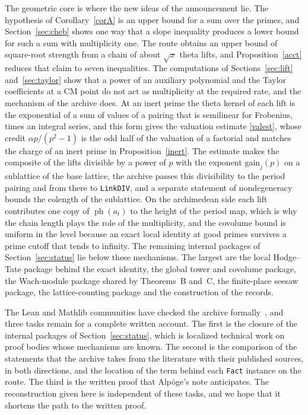 \documentclass[11pt,letterpaper]{article}
\numberwithin{equation}{section}
\begin{document}
The geometric core is where the new ideas of the announcement lie. The hypothesis of Corollary~\ref{corA} is an upper bound for a sum over the primes, and Section~\ref{sec:cheb} shows one way that a slope inequality produces a lower bound for such a sum with multiplicity one. The route obtains an upper bound of square-root strength from a chain of about $\sqrt x$ theta lifts, and Proposition~\ref{acct} reduces that claim to seven inequalities. The computations of Sections~\ref{sec:lift} and~\ref{sec:taylor} show that a power of an auxiliary polynomial and the Taylor coefficients at a CM point do not act as multiplicity at the required rate, and the mechanism of the archive does. At an inert prime the theta kernel of each lift is the exponential of a sum of values of a pairing that is semilinear for Frobenius, times an integral series, and this form gives the valuation estimate \eqref{valest}, whose credit $\alpha p/(p^2-1)$ is the odd half of the valuation of a factorial and matches the charge of an inert prime in Proposition~\ref{inert}. The estimate makes the composite of the lifts divisible by a power of $p$ with the exponent $\mathrm{gain}_j(p)$ on a sublattice of the base lattice, the archive passes this divisibility to the period pairing and from there to \texttt{LinkDIV}, and a separate statement of nondegeneracy bounds the colength of the sublattice. On the archimedean side each lift contributes one copy of $\operatorname{ph}(a_t)$ to the height of the period map, which is why the chain length plays the role of the multiplicity, and the covolume bound is uniform in the level because an exact local identity at good primes survives a prime cutoff that tends to infinity. The remaining internal packages of Section~\ref{sec:status} lie below these mechanisms. The largest are the local Hodge--Tate package behind the exact identity, the global tower and covolume package, the Wach-module package shared by Theorems~B and~C, the finite-place seesaw package, the lattice-counting package and the construction of the records.

The Lean and Mathlib communities have checked the archive formally~\cite{leanstatement}, and three tasks remain for a complete written account. The first is the closure of the internal packages of Section~\ref{sec:status}, which is localized technical work on proof bodies whose mechanisms are known. The second is the comparison of the statements that the archive takes from the literature with their published sources, in both directions, and the location of the term behind each \texttt{Fact} instance on the route. The third is the written proof that Alp\"oge's note anticipates. The reconstruction given here is independent of these tasks, and we hope that it shortens the path to the written proof.
\end{document}
